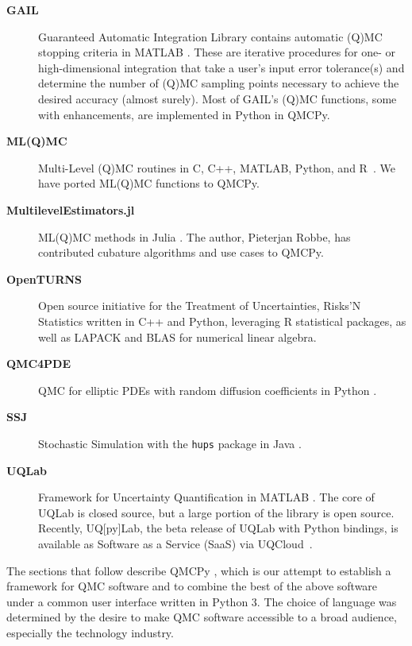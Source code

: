 \documentclass[graybox]{svmult}
\begin{document}
\begin{description}%
	\item[\textbf{GAIL}] Guaranteed Automatic Integration Library  contains automatic (Q)MC stopping criteria in MATLAB \cite{ChoEtal21a,HCJJ14}. These are iterative procedures for one- or high-dimensional integration that take a user's input error tolerance(s) and determine the number of (Q)MC sampling points necessary to achieve the desired accuracy (almost surely).  Most of GAIL's (Q)MC functions, some with enhancements, are implemented in Python in QMCPy.
	\item[\textbf{ML(Q)MC}] Multi-Level (Q)MC routines in C, C++, MATLAB, Python, and R~\cite{GilesSoft}. We have ported ML(Q)MC functions to QMCPy.
	\item[\textbf{MultilevelEstimators.jl}] ML(Q)MC methods in Julia \cite{Rob21}. The author, Pieterjan Robbe, has contributed cubature algorithms and use cases to QMCPy.
	\item[\textbf{OpenTURNS}] Open source initiative for the Treatment of Uncertainties, Risks'N Statistics \cite{OpenTURNS} written in C++ and Python, leveraging R statistical packages, as well as LAPACK and BLAS for numerical linear algebra.
	\item[\textbf{QMC4PDE}] QMC for elliptic PDEs with random diffusion coefficients in Python \cite{KuoNuy16a}.
	\item[\textbf{SSJ}] Stochastic Simulation with the \texttt{hups} package in Java \cite{SSJ}.
	\item[\textbf{UQLab}] Framework for Uncertainty Quantification in MATLAB \cite{UQLab2014}.  The core of UQLab is closed source, but a large portion of the library is open source. Recently,  UQ[py]Lab, the beta release of UQLab with Python bindings, is  available as Software as a Service (SaaS) via UQCloud~\cite{lataniotis2021uncertainty}.

\end{description}

The sections that follow describe QMCPy \cite{QMCPy2020a}, which is our attempt to establish a framework for QMC software and to combine the best of the above software under a common user interface written in Python 3.  The choice of language was determined by the desire to make QMC software accessible to a broad audience, especially the technology industry.
\end{document}
